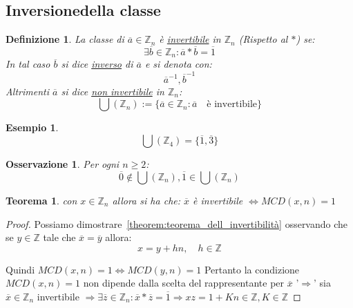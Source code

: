 \documentclass{article}
\newtheorem{exmp}{Esempio}[section]
\newtheorem{theorem}{Teorema}[section]
\newtheorem{definition}{Definizione}[section]
\newtheorem{oss}{Osservazione}[section]
\begin{document}
\subsection{Inversionedella classe}
\begin{definition}
        La classe di $\overline{a} \in \mathbb{Z}_n$ è \underline{invertibile} in $ \mathbb{Z}_n $ (Rispetto al $*$) se:
        \begin{equation*}
                \exists \overline{b} \in \mathbb{Z}_n : \overline{a} * \overline{b} = \overline{1}
        \end{equation*}
        In tal caso $\overline{b}$ si dice \underline{inverso} di $\overline{a}$ e si denota con:
        \begin{equation*}
                \overline{a}^{-1}, \overline{b}^{-1}
        \end{equation*}
        Altrimenti $\overline{a}$ si dice \underline{non invertibile} in $\mathbb{Z}_n$:
        \begin{equation*}
                \bigcup(\mathbb{Z}_n) := \{\overline{a} \in \mathbb{Z}_n : \overline{a} \quad \mbox{è invertibile}\} 
        \end{equation*}
\end{definition}


\begin{exmp}
        \begin{equation*}
                \bigcup(\mathbb{Z}_4) = \{\overline{1}, \overline{3}\}
        \end{equation*} 
\end{exmp}


\begin{oss}
        Per ogni $n \ge 2$:
        \begin{equation*}
                \overline{0} \not \in \bigcup(\mathbb{Z}_n), \overline{1} \in \bigcup(\mathbb{Z}_n)
        \end{equation*}

\end{oss}

\begin{theorem}
        con $x \in \mathbb{Z}_n$ allora si ha che:\newline
        $ \overline{x} $ è invertibile $\Leftrightarrow MCD(x,n) = 1$
\end{theorem}

\begin{proof}
       Possiamo dimostrare~\ref{theorem:teorema_dell_invertibilità} osservando che se $y \in \mathbb{Z}$ tale che $\overline{x} = \overline{y}$ allora:
       \begin{equation*}
               x = y + hn, \quad h \in \mathbb{Z}
       \end{equation*}

       Quindi $MCD(x,n) = 1 \Leftrightarrow MCD(y,n) = 1$
       Pertanto la condizione $MCD(x,n) = 1$ non dipende dalla scelta del rappresentante per $\overline{x}$ \newline
       '$\Rightarrow$' sia $\overline{x} \in \mathbb{Z}_n$ invertibile $ \Rightarrow \exists \overline{z} \in \mathbb{Z}_n : \overline{x} * \overline{z} = \overline{1} \Rightarrow xz = 1 + Kn \in \mathbb{Z}, K \in \mathbb{Z}$
\end{proof}
\end{document}
